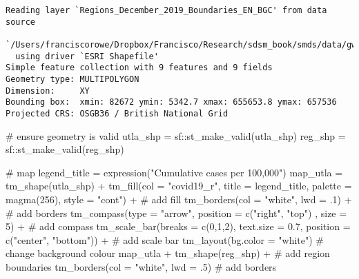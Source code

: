 \documentclass[
  letterpaper,
  krantz2]{style/krantz}
\newenvironment{Shaded}{\begin{snugshade}}{\end{snugshade}}
\newcommand{\AttributeTok}[1]{\textcolor[rgb]{0.40,0.45,0.13}{#1}}
\newcommand{\CommentTok}[1]{\textcolor[rgb]{0.37,0.37,0.37}{#1}}
\newcommand{\DecValTok}[1]{\textcolor[rgb]{0.68,0.00,0.00}{#1}}
\newcommand{\FloatTok}[1]{\textcolor[rgb]{0.68,0.00,0.00}{#1}}
\newcommand{\FunctionTok}[1]{\textcolor[rgb]{0.28,0.35,0.67}{#1}}
\newcommand{\NormalTok}[1]{\textcolor[rgb]{0.00,0.23,0.31}{#1}}
\newcommand{\OtherTok}[1]{\textcolor[rgb]{0.00,0.23,0.31}{#1}}
\newcommand{\SpecialCharTok}[1]{\textcolor[rgb]{0.37,0.37,0.37}{#1}}
\newcommand{\StringTok}[1]{\textcolor[rgb]{0.13,0.47,0.30}{#1}}
\begin{document}
\begin{verbatim}
Reading layer `Regions_December_2019_Boundaries_EN_BGC' from data source 
  `/Users/franciscorowe/Dropbox/Francisco/Research/sdsm_book/smds/data/gwr/Regions_December_2019_Boundaries_EN_BGC.shp' 
  using driver `ESRI Shapefile'
Simple feature collection with 9 features and 9 fields
Geometry type: MULTIPOLYGON
Dimension:     XY
Bounding box:  xmin: 82672 ymin: 5342.7 xmax: 655653.8 ymax: 657536
Projected CRS: OSGB36 / British National Grid
\end{verbatim}

\begin{Shaded}
\begin{Highlighting}[]
\CommentTok{\# ensure geometry is valid}
\NormalTok{utla\_shp }\OtherTok{=}\NormalTok{ sf}\SpecialCharTok{::}\FunctionTok{st\_make\_valid}\NormalTok{(utla\_shp)}
\NormalTok{reg\_shp }\OtherTok{=}\NormalTok{ sf}\SpecialCharTok{::}\FunctionTok{st\_make\_valid}\NormalTok{(reg\_shp)}

\CommentTok{\# map}
\NormalTok{legend\_title }\OtherTok{=} \FunctionTok{expression}\NormalTok{(}\StringTok{"Cumulative cases per 100,000"}\NormalTok{)}
\NormalTok{map\_utla }\OtherTok{=} \FunctionTok{tm\_shape}\NormalTok{(utla\_shp) }\SpecialCharTok{+}
  \FunctionTok{tm\_fill}\NormalTok{(}\AttributeTok{col =} \StringTok{"covid19\_r"}\NormalTok{, }\AttributeTok{title =}\NormalTok{ legend\_title, }\AttributeTok{palette =} \FunctionTok{magma}\NormalTok{(}\DecValTok{256}\NormalTok{), }\AttributeTok{style =} \StringTok{"cont"}\NormalTok{) }\SpecialCharTok{+} \CommentTok{\# add fill}
  \FunctionTok{tm\_borders}\NormalTok{(}\AttributeTok{col =} \StringTok{"white"}\NormalTok{, }\AttributeTok{lwd =}\NormalTok{ .}\DecValTok{1}\NormalTok{)  }\SpecialCharTok{+} \CommentTok{\# add borders}
  \FunctionTok{tm\_compass}\NormalTok{(}\AttributeTok{type =} \StringTok{"arrow"}\NormalTok{, }\AttributeTok{position =} \FunctionTok{c}\NormalTok{(}\StringTok{"right"}\NormalTok{, }\StringTok{"top"}\NormalTok{) , }\AttributeTok{size =} \DecValTok{5}\NormalTok{) }\SpecialCharTok{+} \CommentTok{\# add compass}
  \FunctionTok{tm\_scale\_bar}\NormalTok{(}\AttributeTok{breaks =} \FunctionTok{c}\NormalTok{(}\DecValTok{0}\NormalTok{,}\DecValTok{1}\NormalTok{,}\DecValTok{2}\NormalTok{), }\AttributeTok{text.size =} \FloatTok{0.7}\NormalTok{, }\AttributeTok{position =}  \FunctionTok{c}\NormalTok{(}\StringTok{"center"}\NormalTok{, }\StringTok{"bottom"}\NormalTok{)) }\SpecialCharTok{+} \CommentTok{\# add scale bar}
  \FunctionTok{tm\_layout}\NormalTok{(}\AttributeTok{bg.color =} \StringTok{"white"}\NormalTok{) }\CommentTok{\# change background colour}
\NormalTok{map\_utla }\SpecialCharTok{+} \FunctionTok{tm\_shape}\NormalTok{(reg\_shp) }\SpecialCharTok{+} \CommentTok{\# add region boundaries}
  \FunctionTok{tm\_borders}\NormalTok{(}\AttributeTok{col =} \StringTok{"white"}\NormalTok{, }\AttributeTok{lwd =}\NormalTok{ .}\DecValTok{5}\NormalTok{) }\CommentTok{\# add borders}
\end{Highlighting}
\end{Shaded}
\end{document}
